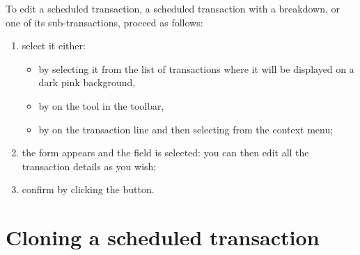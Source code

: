 To edit a scheduled transaction, a scheduled transaction with a breakdown, or one of its sub-transactions, proceed as follows:

\begin{enumerate}
	\item select it either:
	\begin{itemize}
		\item by selecting it from the list of transactions where it will be displayed on a \colorbox[RGB]{245,155,155}{dark pink background},
		\item by  on the  tool in the toolbar,
		\item by  on the transaction line and then selecting  from the context menu;
	\end{itemize}
	\item the form appears and the  field is selected: you can then edit all the transaction details as you wish;
	\item confirm by clicking the  button.
\end{enumerate}


\section{Cloning a scheduled transaction\label{plannedtransactions-duplicate}}

